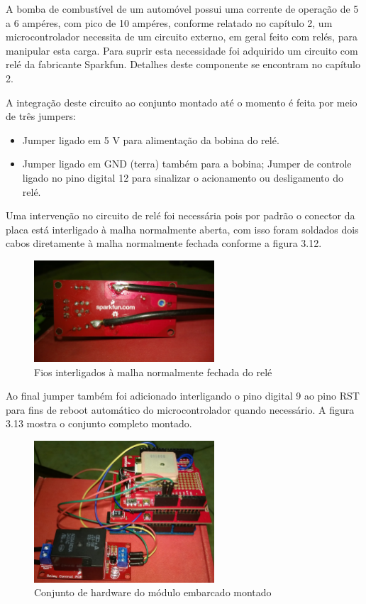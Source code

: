 A bomba de combustível de um automóvel possui uma corrente de operação de 5 a 6 ampéres, com pico de 10 ampéres, conforme relatado no capítulo 2, um microcontrolador necessita de um circuito externo, em geral feito com relés, para manipular esta carga. Para suprir esta necessidade foi adquirido um circuito com relé da fabricante Sparkfun. Detalhes deste componente se encontram no capítulo 2.

A integração deste circuito ao conjunto montado até o momento é feita por meio de três jumpers:

\begin{itemize}
	\item Jumper ligado em 5 V para alimentação da bobina do relé.
	\item Jumper ligado em GND (terra) também para a bobina;
  \intem Jumper de controle ligado no pino digital 12 para sinalizar o acionamento ou desligamento do relé.
\end{itemize}

Uma intervenção no circuito de relé foi necessária pois por padrão o conector da placa está interligado à malha normalmente aberta, com isso foram soldados dois cabos diretamente à malha normalmente fechada conforme a figura 3.12.

\begin{figure}[!htb]
\centering
\includegraphics[width=0.6\textwidth]{figures/jmpNC.jpg}
\caption{Fios interligados à malha normalmente fechada do relé}
\label{1}
\end{figure}

Ao final jumper também foi adicionado interligando o pino digital 9 ao pino RST para fins de reboot automático do microcontrolador quando necessário. A figura 3.13 mostra o conjunto completo montado.

\begin{figure}[!htb]
\centering
\includegraphics[width=0.6\textwidth]{figures/fullMount.jpg}
\caption{Conjunto de hardware do módulo embarcado montado}
\label{1}
\end{figure}

